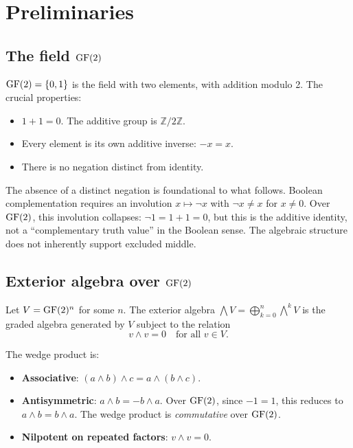 \section{Preliminaries}\label{sec:prelim}

\subsection{The field $\operatorname{GF}(2)$}

$\operatorname{GF}(2) = \{0, 1\}$ is the field with two elements, with addition
modulo 2. The crucial properties:
\begin{itemize}[nosep]
  \item $1 + 1 = 0$. The additive group is $\mathbb{Z}/2\mathbb{Z}$.
  \item Every element is its own additive inverse: $-x = x$.
  \item There is no negation distinct from identity.
\end{itemize}

The absence of a distinct negation is foundational to what follows.
Boolean complementation requires an involution $x \mapsto \neg x$
with $\neg x \neq x$ for $x \neq 0$. Over $\operatorname{GF}(2)$, this involution
collapses: $\neg 1 = 1 + 1 = 0$, but this is the additive identity,
not a ``complementary truth value'' in the Boolean sense. The
algebraic structure does not inherently support excluded middle.

\subsection{Exterior algebra over $\operatorname{GF}(2)$}\label{sec:exterior}

Let $V = \operatorname{GF}(2)^n$ for some $n$. The exterior algebra
$\bigwedge V = \bigoplus_{k=0}^{n} \bigwedge^k V$ is the graded
algebra generated by $V$ subject to the relation
\begin{equation}\label{eq:self-wedge}
  v \wedge v = 0 \quad \text{for all } v \in V.
\end{equation}

The wedge product is:
\begin{itemize}[nosep]
  \item \textbf{Associative}: $(a \wedge b) \wedge c = a \wedge (b \wedge c)$.
  \item \textbf{Antisymmetric}: $a \wedge b = -b \wedge a$. Over $\operatorname{GF}(2)$,
    since $-1 = 1$, this reduces to $a \wedge b = b \wedge a$.
    The wedge product is \emph{commutative} over $\operatorname{GF}(2)$.
  \item \textbf{Nilpotent on repeated factors}: $v \wedge v = 0$.
\end{itemize}

